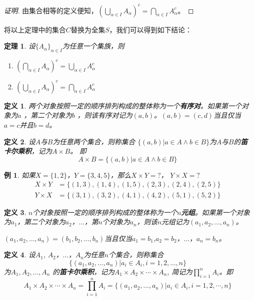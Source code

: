 \documentclass{book}[oneside]
\newtheorem{Def}{定义}[chapter]
\newtheorem{Thm}{定理}[chapter]
\newtheorem*{Example}{例}
\begin{document}
\begin{CJK*}{UTF8}{gbsn}
\begin{proof}[证明]
    由集合相等的定义便知，$(\bigcup_{\alpha \in I}A_{\alpha})^c=\bigcap_{\alpha\in I}A_{\alpha}^c$。
  \end{proof}
将以上定理中的集合$C$替换为全集$S$，我们可以得到如下结论：
  \begin{Thm}
    设$\{A_{\alpha}\}_{\alpha \in I}$为任意一个集族，则
    \begin{enumerate}
    \item $(\bigcap_{\alpha \in I}A_{\alpha})^c=\bigcup_{\alpha\in I}A_{\alpha}^c$
    \item $(\bigcup_{\alpha \in I}A_{\alpha})^c=\bigcap_{\alpha\in I}A_{\alpha}^c$
    \end{enumerate}
    \end{Thm}
  \begin{Def}
    两个对象按照一定的顺序排列构成的整体称为一个{\bfseries 有序对}。如果第一个对象为$a$ ，第二个对象为$b$ ，则该有序对记为$(a,b)$。$(a,b)=(c,d)$当且仅当$a=c$并且$b=d$。
  \end{Def}
  \begin{Def}
    设$A$与$B$为任意两个集合，则称集合 $\{(a,b)|a\in A \land b \in B\}$为$A$与$B$的{\bfseries 笛卡尔乘积}，记为$A \times B$。
即
\begin{equation*}
  A \times B = \{(a,b)|a \in A \land b \in B\}
\end{equation*}
  \end{Def}
  \begin{Example}
    如果$X=\{1,2\}$，$Y=\{3,4,5\}$，那么$X \times Y = ?$， $Y \times X = ?$
    \begin{equation*}
      \begin{split}
       X \times Y &= \{ (1,3), (1,4), (1,5), (2,3), (2,4), (2, 5) \}\\
       Y \times X &= \{(3,1), (3,2), (4,1), (4,2), (5,1), (5,2)\}
      \end{split}
    \end{equation*}
  \end{Example}

  \begin{Def}
    $n$个对象按照一定的顺序排列构成的整体称为一个{\bfseries $n$元组}。如果第一个对象为$a_1$，第二个对象为$a_2$，$\ldots$，第$n$个对象为$a_n$，则该$n$元组记为$(a_1,a_2, \ldots, a_n)$。

 $(a_1,a_2, \ldots, a_n)=(b_1,b_2, \ldots, b_n)$当且仅当$a_1=b_1$,$a_2=b_2$，$\ldots$，$a_n=b_n$。
  \end{Def}
  \begin{Def}
    设$A_1$, $A_2$，$\ldots$，$A_n$为任意$n$个集合，则称集合 \[\{(a_1,a_2, \ldots, a_n)|a_i\in A_i, i = 1,2,\ldots, n\}\] 为$A_1, A_2, \ldots, A_n$ 的{\bfseries 笛卡尔乘积}，记为$A_1 \times A_2 \times \cdots \times A_n$, 简记为$\prod_{i=1}^nA_i$。即
\begin{equation*}
  A_1 \times A_2 \times \cdots \times A_n = \prod_{i=1}^nA_i = \{(a_1,a_2, \ldots, a_n)|a_i \in A_i, i = 1, 2, \cdots, n\}
\end{equation*}


\end{Def}
\end{CJK*}
\end{document}
